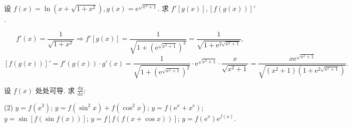 \begin{exercise}[3.1.9]
    设 $f(x)=\ln(x+\sqrt{1+x^2}), g(x)=\mathrm{e}^{\sqrt{x^2+1}}$. 求 $f'[g(x)], [f(g(x))]'$.
\end{exercise}

\begin{solution}
    $$f'(x) = \frac{1}{\sqrt{1+x^2}} \Rightarrow f'[g(x)] = \frac{1}{\sqrt{1+(\mathrm{e}^{\sqrt{x^2+1}})^2}} = \frac{1}{\sqrt{1+\mathrm{e}^{2\sqrt{x^2+1}}}},$$
    $$[f(g(x))]' = f'(g(x)) \cdot g'(x) = \frac{1}{\sqrt{1+(\mathrm{e}^{\sqrt{x^2+1}})^2}} \cdot \mathrm{e}^{\sqrt{x^2+1}} \cdot \frac{x}{\sqrt{x^2+1}} = \frac{x \mathrm{e}^{\sqrt{x^2+1}}}{\sqrt{(x^2+1)(1+\mathrm{e}^{2\sqrt{x^2+1}})}}.$$
\end{solution}

\begin{exercise}[3.1.10]
    设 $f(x)$ 处处可导. 求 $\frac{\mathrm{d}y}{\mathrm{d}x}$:
    \begin{tasks}[label=(\arabic*)](2)
        \task $y = f(x^3)$;
        \task $y = f(\sin^2 x) + f(\cos^2 x)$;
        \task $y = f(\mathrm{e}^x+x^{\mathrm{e}})$;
        \task $y = \sin[f(\sin f(x))]$;
        \task $y = f[f(f(x+\cos x))]$;
        \task $y = f(\mathrm{e}^x) \mathrm{e}^{f(x)}$.
    \end{tasks}
\end{exercise}

